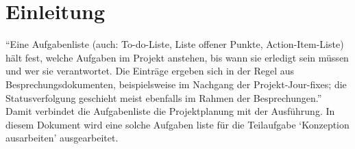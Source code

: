 \documentclass[
  a4paper,
  12pt,
  DIV=12,        %
  parskip=half,  %
  headings=small %
]{scrartcl}
\theoremstyle{definition}
\theoremstyle{definition}
\begin{document}
\newpage

\tableofcontents

\newpage

\section{Einleitung}\label{einleitung}

``Eine Aufgabenliste (auch: To-do-Liste, Liste offener Punkte,
Action-Item-Liste) hält fest, welche Aufgaben im Projekt anstehen, bis
wann sie erledigt sein müssen und wer sie verantwortet. Die Einträge
ergeben sich in der Regel aus Besprechungsdokumenten, beispielsweise im
Nachgang der Projekt-Jour-fixes; die Statusverfolgung geschieht meist
ebenfalls im Rahmen der Besprechungen.''\cite{BibEntry2013Sep} Damit verbindet die
Aufgabenliste die Projektplanung mit der Ausführung. In diesem Dokument
wird eine solche Aufgaben liste für die Teilaufgabe `Konzeption
ausarbeiten' ausgearbeitet.
\end{document}
